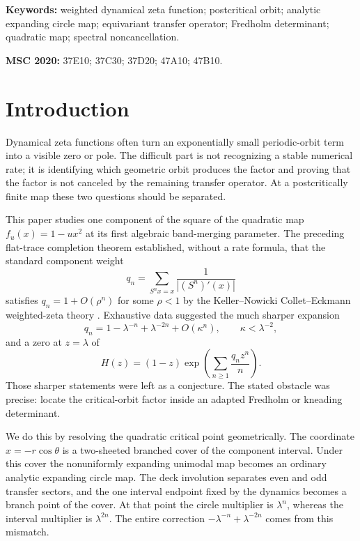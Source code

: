 \documentclass[11pt]{article}
\theoremstyle{definition}
\theoremstyle{remark}
\begin{document}
\noindent\textbf{Keywords:} weighted dynamical zeta function; postcritical
orbit; analytic expanding circle map; equivariant transfer operator;
Fredholm determinant; quadratic map; spectral noncancellation.

\medskip
\noindent\textbf{MSC 2020:} 37E10; 37C30; 37D20; 47A10; 47B10.

\section{Introduction}
\label{sec:introduction}

Dynamical zeta functions often turn an exponentially small periodic-orbit
term into a visible zero or pole.  The difficult part is not recognizing a
stable numerical rate; it is identifying which geometric orbit produces the
factor and proving that the factor is not canceled by the remaining transfer
operator.  At a postcritically finite map these two questions should be
separated.

This paper studies one component of the square of the quadratic map
$f_u(x)=1-u x^2$ at its first algebraic band-merging parameter.  The preceding
flat-trace completion theorem established, without a rate formula, that the
standard component weight
\begin{equation}\label{eq:q-introduction}
 q_n=\sum_{S^n x=x}\frac1{|(S^n)'(x)|}
\end{equation}
satisfies $q_n=1+O(\rho^n)$ for some $\rho<1$ by the
Keller--Nowicki Collet--Eckmann weighted-zeta theory
\citep{KellerNowicki1992,WangFlatTrace2026}.  Exhaustive data suggested the
much sharper expansion
\begin{equation}\label{eq:previous-sharp}
 q_n=1-\lambda^{-n}+\lambda^{-2n}+O(\kappa^n),
 \qquad \kappa<\lambda^{-2},
\end{equation}
and a zero at $z=\lambda$ of
\begin{equation}\label{eq:H-introduction}
 H(z)=(1-z)\exp\left(\sum_{n\ge1}\frac{q_nz^n}{n}\right).
\end{equation}
Those sharper statements were left as a conjecture.  The stated obstacle was
precise: locate the critical-orbit factor inside an adapted Fredholm or
kneading determinant.

We do this by resolving the quadratic critical point geometrically.  The
coordinate $x=-r\cos\theta$ is a two-sheeted branched cover of the component
interval.  Under this cover the nonuniformly expanding unimodal map becomes
an ordinary analytic expanding circle map.  The deck involution separates
even and odd transfer sectors, and the one interval endpoint fixed by the
dynamics becomes a branch point of the cover.  At that point the circle
multiplier is $\lambda^n$, whereas the interval multiplier is $\lambda^{2n}$.
The entire correction $-\lambda^{-n}+\lambda^{-2n}$ comes from this mismatch.
\end{document}
